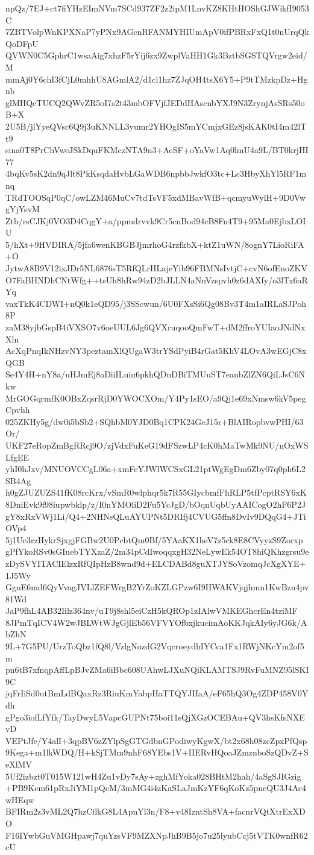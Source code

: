 npQz/7EJ+ct7fiYHzEImNVm7SCd937ZF2z2ipM1LnvKZ8KHtHOShGJWikfI9053C
7ZBTVolpWnKPXNaP7yPNx9AGcnRFANMYHIUmApV0ifPBRxFxQ1t0nUrqQkQoDFpU
QVWN0C5GphrC1wsaAig7xhzF5rYij6zx9ZwplVaHH1Gk3BztbSGSTQVrgw2eid/M
mmAj0Y6chI3fCjL0mhhU8AGmlA2/d1cl1hz7ZJqOH4tsX6Y5+P9tTMzkpDz+Hgnb
glMHQcTUCQ2QWvZR5oI7s2t43mbOFVjfJEDdHAscnbYXJ9N3ZrynjAsSRs50oB+X
2U5B/jlYyeQVsc6Q9j3uKNNLL3yumr2YHOgIS5mYCmjxGEz8jsKAK0tI4m42lTt9
sina0T8PrChVweJSkDquFKMczNTA9n3+AeSF+oYaVw1Aq0lmU4a9L/BT0krjHI77
4bqKv5sK2dn9qJlt8PkKsqdaHvbLGaWDB6npbbJwkfO3tc+Lc3HbyXhYl5RF1mnq
TRdTOOSqP0qC/owLZM46MuCv7tdTsVF5xdMBavWfB+qcmyuWylH+9D0VwgYjYsvM
Ztb/rsCJKj0VO3D4CqgY+a/ppmdrvvk9Cr5cnBod94cB8Fn4T9+95Ma0EjbxLOIU
5/hXt+9HVDIRA/5jfa6wenKBGBJjmrhoG4rzfkbX+ktZ1uWN/8ognY7LioRiFA+O
JytwA8B9V12ixJDr5NL6876sT5RfQLrHLajeYib96FBMNsIvtjC+cvN6ofEnoZKV
O7FaBHNDhCNtWfg++tsUh8hRw94zD2bJLLN4aNnVzspvh0z6dAXfy/o3lTx6aRYq
vaxTkK4CDWI+nQ0k1eQD95/j3SScwun/6U0FXsSi6Qg08Bv3T4m1aIRLaSJPoh8P
zaM38yjbGspB4iVXSO7v6oeUUL6Jg6QVXruqooQmFwT+dM2ffroYUIaoJNdNxXln
AcXqPnqIkNHzvNY3peztamXlQUgaW3trYSdPyiB4rGat5KhV4LOvA3wEGjC8xQGB
Se4Y4H+nY8a/uHJmEj8aDiiILuiu6pkhQDnDBiTMUuST7eaubZlZN6QiLJsC6Nkw
MrGOGqrmfK0OBxZqsrRjD0YWOCXOm/Y4Py1sEO/a9Qj1e69xNmsw6kV5pegCpvhh
025ZKHy5g/dw0i5bSb2+SQhbM0YJD0Bq1CPK24GeJ15r+BlAIRopbvwPHI/63Or/
UKF27eRopZmBgRRcj9O/zjVdxFuKeG19dFSzwLP4cK0hMaTwMk9NU/nOxWSLfgEE
yhI0hJxv/MNUOVCCgL06a+xmFeYJWlWCSxGL21ptWgEgDm6Zby07q0ph6L2SB4Ag
h0gZJUZUZS41fK08rcKrx/vSmR0wlphqr5k7R55GIycbmfFhRLP5tfPcptRSY6xK
8DniEvk9f98iupwbklp/z/I0nYMOliD2Fu5YcJgD/bOqnUqbUyAAICogO2hF6P2J
gY8xRxVWj1Li/Q4+2NHNsQLuAYUPNt5DRIfj4CVUG5ffn8DvIv9DQqG4+JTiOVp4
5j1Uc3rzHykrSjxgjFGBw2U0PcbtQm0Bf/5YAaKX1heV7z5ck8E8CVyyzS9Zorxp
gPfYkoRSv0sGIuebTYXzaZ/2m34pCdIwoqqxgH32NeLywEk54OT8hiQKhzgrsu9e
zDySVYITACIElzxRfQIpHzB8wnd9d+ELCDABd8guXTJYSoVzomqJcXgXYE+1J5Wy
GgnE6md6QyVvagJVLlZEFWrgB2YrZoKZLGPzw6I9HWAKVjqjhmn1KwBzn4pv81Wd
JaP9fhL4AB32Iilz364nv/uT9j8shl5eiCzH5kQROp1zIAlwVMKEGhcrEn4tziMF
8JPmTqICV4W2wJBLWtWJgGjlEb56VFVYOfbxjkucimAoKKJqkAIy6yJG6k/AbZhN
9L+7G5PU/UrzToQbz1fQ8l/VzlgNozdG2VqcroeydhIYCca1Fx1RWjNKcYm2of5m
pn6tB7xfnqpAffLpBJvZMa6iBbc608UAhwLJXuNQiKLAMTSJ9RvFuMNZ95lSKI9C
jqFrIiSd0utBmLdBQaxRz3RiuKmYabpHaTTQYJIIaA/eF65hQ3Og4ZDP458V0Ydh
gPgo3iofLfYfk/TayDwyL5VapcGUPNt75boi11sQjXGzOCEBAu+QV3hsKfsNXEvD
VEPtJfe/Y4alI+3qpBV6zZYlpSgGTGdbnGPodiwyKgwX/bt2x68h08zcZpxPfQsp
9Kega+m1lkWDQ/H+kSjTMm9nhF68YEbs1V+IIERvHQoaJZmznboSzQDvZ+SeXlMV
5Uf2izbzt0T015W121wH4Zu1vDy7sAy+zghMfYoka028BHtM2hah/4aSgSJIGzig
+PB9Kcm61pRxJiYM1pQcM/3mMG4i4zKaSLaJmKzYF6qKoKz5pneQU3J4Ac4wHEqw
BFIRm2z3vML2Q7hzCilkG8L4ApnYl3n/F8+v48IzntSh8VA+facnrVQtXtrExXDO
F16IYwbGuVMGHpawj7quYzsVF9MZXNpJhB9B5jo7u25lyubCcj5tVTK0wnfR62cU
